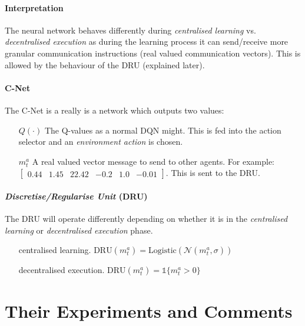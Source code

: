 \documentclass{article}
\begin{document}
    \paragraph{Interpretation} The neural network behaves differently during \emph{centralised learning} vs. \emph{decentralised execution} as during the learning process it can send/receive more granular communication instructions (real valued communication vectors). This is allowed by the behaviour of the DRU (explained later).

    \paragraph{C-Net} The C-Net is a really is a network which outputs two values:
    \begin{enumerate}
        \item[$Q(\cdot)$] The Q-values as a normal DQN might. This is fed into the action selector and an \emph{environment action} is chosen.
        \item[$m^a_t$] A real valued vector message to send to other agents. For example: $\begin{bmatrix} 0.44 & 1.45 & 22.42 & -0.2 & 1.0 & -0.01 \end{bmatrix}$. This is sent to the DRU.
    \end{enumerate}
    \paragraph{\emph{Discretise/Regularise Unit} (DRU)} The DRU will operate differently depending on whether it is in the \emph{centralised learning} or \emph{decentralised execution} phase. 
      
    \begin{enumerate}
        \item[centralised learning.] $\text{DRU}(m^a_t) = \text{Logistic}(\mathcal{N}(m^a_t, \sigma))$
        \item[decentralised execution.] $\text{DRU}(m^a_t) = \mathds{1} \{ m^a_t > 0 \}$
    \end{enumerate}
    

    \section{Their Experiments and Comments}
\end{document}
